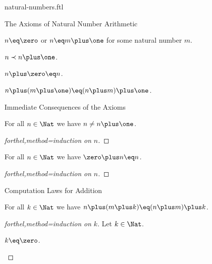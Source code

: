 \documentclass{naproche-library}
\begin{document}
\begin{smodule}[title=Natural Numbers]{natural-numbers.ftl}
\begin{sfragment}{The Axioms of Natural Number Arithmetic}
  \begin{axiom}[forthel,title=Peano Axiom III,id=NatNumberIsZeroOrSuccessorAx]
    $n\eq\zero$ or $n\eq m\plus\one$ for some natural number $m$.
  \end{axiom}

  \begin{axiom}[forthel,title=Induction Axiom,id=InductionAx]
    $n\prec n\plus\one$.
  \end{axiom}

  \begin{axiom}[forthel,title=Addition Axiom I,id=AdditionWithZeroAx]
    $n\plus\zero\eq n$.
  \end{axiom}

  \begin{axiom}[forthel,title=Addition Axiom II,id=AdditionWithSuccessorAx]
    $n\plus(m\plus\one)\eq(n\plus m)\plus\one$.
  \end{axiom}
\end{sfragment}

\begin{sfragment}{Immediate Consequences of the Axioms}
  \begin{proposition}[forthel,id=NatNumberIsNotItsOwnSuccessorProp]
    For all $n\in\Nat$ we have $n\neq n\plus\one$.
  \end{proposition}
  \begin{proof}[forthel,method=induction on $n$]\end{proof}

  \begin{proposition}[forthel,id=ZeroIsLeftIdentityOfPlusProp]
    For all $n\in\Nat$ we have $\zero\plus n\eq n$.
  \end{proposition}
  \begin{proof}[forthel,method=induction on $n$]\end{proof}
\end{sfragment}

\begin{sfragment}{Computation Laws for Addition}
  \begin{proposition}[forthel,title=Associativity,id=PlusIsAssociativeProp]
    For all $k\in\Nat$ we have $n\plus(m\plus k)\eq(n\plus m)\plus k$.
  \end{proposition}
  \begin{proof}[forthel,method=induction on $k$]
    Let $k\in\Nat$.

    \begin{case}{$k\eq\zero$.} \end{case}


\end{proof}
\end{sfragment}
\end{smodule}
\end{document}
